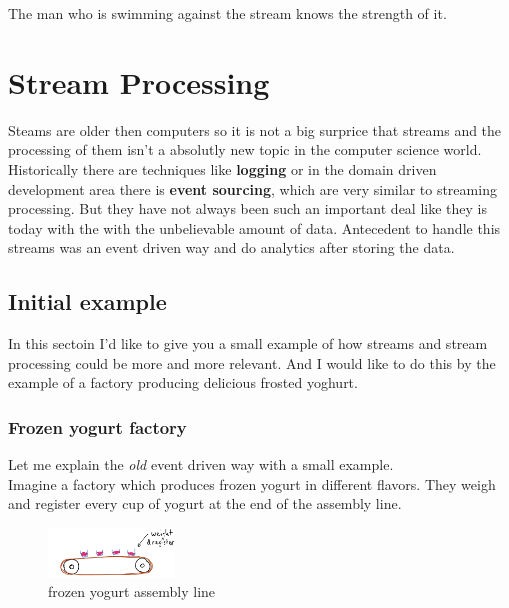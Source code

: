 \begin{savequote}[75mm]
The man who is swimming against the stream knows the strength of it.
\end{savequote}

\chapter{Stream Processing}
Steams are older then computers so it is not a big surprice that streams
and the processing of them isn't a absolutly new topic in the computer science world.
Historically there are techniques like \textbf{logging} or in the domain driven development area there is \textbf{event sourcing},
which are very similar to streaming processing.
But they have not always been such an important deal like they is today with the with the unbelievable amount of data.
Antecedent to handle this streams was an event driven way and do analytics after storing the data.\\

\newpage

\section{Initial example}
In this sectoin I'd like to give you a small example of how streams and stream processing could be more and more
relevant. And I would like to do this by the example of a factory producing delicious frosted yoghurt.

\subsection{Frozen yogurt factory}
Let me explain the \textit{old} event driven way with a small example.\\
Imagine a factory which produces frozen yogurt in different flavors.
They weigh and register every cup of yogurt at the end of the assembly line.\\

\begin{figure}[H]
\centering
\captionsetup{justification=centering}
\includegraphics[width=0.3\textwidth]{images/cups.png}
\caption[Frozen yogurt assembly line]{frozen yogurt assembly line}
\end{figure}

